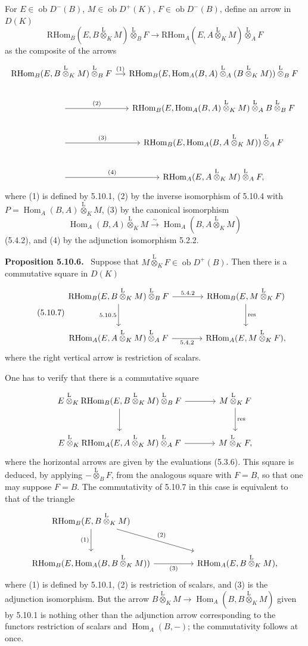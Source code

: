 \documentclass[11pt]{article}
\newenvironment{statement}[1]{\par\medskip\noindent\textbf{#1.}\ }{\par\medskip}
\DeclareMathOperator{\Hom}{Hom}
\newcommand{\ob}{\operatorname{ob}}
\providecommand{\RHom}{\mathrm{RHom}}
\providecommand{\lten}{\overset{\mathrm L}{\otimes}}
\providecommand{\RHom}{\mathrm{RHom}}
\providecommand{\Hom}{\operatorname{Hom}}
\providecommand{\ob}{\operatorname{ob}}
\providecommand{\lten}{\overset{\mathrm L}{\otimes}}
\providecommand{\RHom}{\mathrm R\mathcal{H}om}
\providecommand{\lten}{\overset{\mathrm L}{\otimes}}
\providecommand{\lten}{\overset{\mathrm L}{\otimes}}
\providecommand{\lten}{\overset{\mathrm L}{\otimes}}
\providecommand{\lten}{\overset{\mathrm L}{\otimes}}
\providecommand{\RHom}{\mathrm{RHom}}
\begin{document}
For $E\in\ob D^-(B)$, $M\in\ob D^+(K)$, $F\in\ob D^-(B)$, define an arrow in $D(K)$
\begin{equation}\tag{5.10.5}
\RHom_B(E,B\lten_KM)\lten_BF\longrightarrow\RHom_A(E,A\lten_KM)\lten_AF
\end{equation}
as the composite of the arrows
\[
\begin{tikzcd}[column sep=small]
\RHom_B(E,B\lten_KM)\lten_BF \arrow[r,"(1)"] & \RHom_B(E,\Hom_A(B,A)\lten_A(B\lten_KM))\lten_BF \\
\arrow[r,"(2)"] & \RHom_B(E,\Hom_A(B,A)\lten_KM)\lten_A B\lten_BF \\
\arrow[r,"(3)"] & \RHom_B(E,\Hom_A(B,A\lten_KM))\lten_AF \\
\arrow[r,"(4)"] & \RHom_A(E,A\lten_KM)\lten_AF,
\end{tikzcd}
\]
where (1) is defined by 5.10.1, (2) by the inverse isomorphism of 5.10.4 with $P=\Hom_A(B,A)\lten_KM$, (3) by the canonical isomorphism
\[
\Hom_A(B,A)\lten_KM\xrightarrow{\sim}\Hom_A(B,A\lten_KM)
\]
(5.4.2), and (4) by the adjunction isomorphism 5.2.2.

\begin{statement}{Proposition 5.10.6}
Suppose that $M\lten_KF\in\ob D^+(B)$. Then there is a commutative square in $D(K)$
\begin{equation}\tag{5.10.7}
\begin{tikzcd}[column sep=large,row sep=large]
\RHom_B(E,B\lten_KM)\lten_BF \arrow[r,"5.4.2"] \arrow[d,"5.10.5"'] & \RHom_B(E,M\lten_KF) \arrow[d,"\mathrm{res}"]\\
\RHom_A(E,A\lten_KM)\lten_AF \arrow[r,"5.4.2"'] & \RHom_A(E,M\lten_KF),
\end{tikzcd}
\end{equation}
where the right vertical arrow is restriction of scalars.
\end{statement}

One has to verify that there is a commutative square
\[
\begin{tikzcd}[column sep=large,row sep=large]
E\lten_K\RHom_B(E,B\lten_KM)\lten_BF \arrow[r] \arrow[d] & M\lten_KF \arrow[d,"\mathrm{res}"]\\
E\lten_K\RHom_A(E,A\lten_KM)\lten_AF \arrow[r] & M\lten_KF,
\end{tikzcd}
\]
where the horizontal arrows are given by the evaluations (5.3.6). This square is deduced, by applying $-\lten_BF$, from the analogous square with $F=B$, so that one may suppose $F=B$. The commutativity of 5.10.7 in this case is equivalent to that of the triangle
\[
\begin{tikzcd}[column sep=huge,row sep=large]
\RHom_B(E,B\lten_KM) \arrow[d,"(1)"'] \arrow[dr,"(2)"] & \\
\RHom_B(E,\Hom_A(B,B\lten_KM)) \arrow[r,"(3)"'] & \RHom_A(E,B\lten_KM),
\end{tikzcd}
\]
where (1) is defined by 5.10.1, (2) is restriction of scalars, and (3) is the adjunction isomorphism. But the arrow $B\lten_KM\to\Hom_A(B,B\lten_KM)$ given by 5.10.1 is nothing other than the adjunction arrow corresponding to the functors restriction of scalars and $\Hom_A(B,-)$; the commutativity follows at once.
\end{document}
